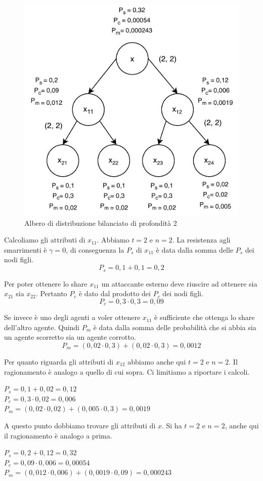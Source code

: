\begin{figure}[H]
	\centering
	\includegraphics[width=0.6\linewidth]{images/chap_analisi_robustezza/robustezza-2-1.pdf}
	\caption{Albero di distribuzione bilanciato di profondità 2}
	\label{fig:robustezza-2-1}
\end{figure}

Calcoliamo gli attributi di $ x_{11} $. Abbiamo $ t = 2 $ e $ n = 2 $.
La resistenza agli smarrimenti è $ \gamma = 0 $,
di conseguenza la $ P_s $ di $ x_{11} $ è data dalla somma delle $ P_s $ dei nodi figli.
$$ P_s = 0,1 + 0,1 = 0,2 $$

Per poter ottenere lo share $ x_{11} $ un attaccante esterno deve riuscire ad ottenere
sia $ x_{21} $ sia $ x_{22} $. Pertanto $ P_c $ è dato dal prodotto dei $ P_c $ dei nodi figli.
$$ P_c = 0,3 \cdot 0,3 = 0,09 $$

Se invece è uno degli agenti a voler ottenere $ x_{11} $ è sufficiente che ottenga
lo share dell'altro agente. Quindi $ P_m $ è data dalla somma delle probabilità
che si abbia sia un agente scorretto sia un agente corrotto.
$$ P_m = (0,02 \cdot 0,3) + (0,02 \cdot 0,3) = 0,0012 $$

Per quanto riguarda gli attributi di $ x_{12} $ abbiamo anche qui $ t = 2 $ e $ n = 2 $.
Il ragionamento è analogo a quello di cui sopra. Ci limitiamo
a riportare i calcoli.
\begin{tightcenter}
	$ P_s = 0,1 + 0,02 = 0,12 $      \\
	$ P_c = 0,3 \cdot 0,02 = 0,006 $ \\
	$ P_m = (0,02 \cdot 0,02) + (0,005 \cdot 0,3) = 0,0019 $
\end{tightcenter}
A questo punto dobbiamo trovare gli attributi di $ x $.
Si ha $ t = 2 $ e $ n = 2 $, anche qui il ragionamento è analogo a prima.
\begin{tightcenter}
	$ P_s = 0,2 + 0,12 = 0,32 $\\
	$ P_c = 0,09 \cdot 0,006 = 0,00054 $\\
	$ P_m = (0,012 \cdot 0,006) + (0,0019 \cdot 0,09) = 0,000243 $
\end{tightcenter}

